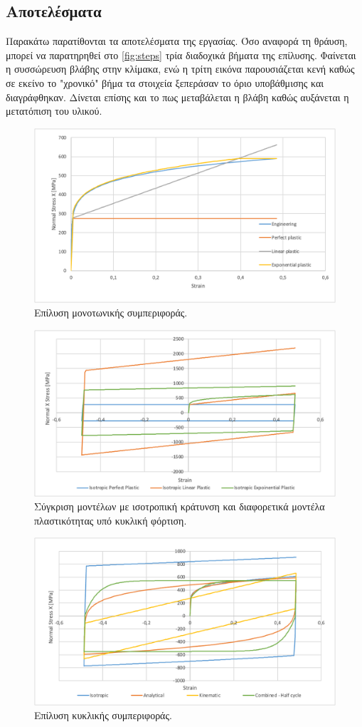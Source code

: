 \documentclass{article}
\begin{document}
\subsection{Αποτελέσματα}
Παρακάτω παρατίθονται τα αποτελέσματα της εργασίας. Όσο αναφορά τη θράυση, μπορεί να παρατηρηθεί στο \ref{fig:steps} τρία διαδοχικά βήματα της επίλυσης. Φαίνεται η συσσώρευση βλάβης στην κλίμακα, ενώ η τρίτη εικόνα παρουσιάζεται κενή καθώς σε εκείνο το "χρονικό" βήμα τα στοιχεία ξεπεράσαν το όριο υποβάθμισης και διαγράφθηκαν. Δίνεται επίσης και το πως μεταβάλεται η βλάβη καθώς αυξάνεται η μετατόπιση του υλικού.
\begin{figure}[H]
    \centering
    \includegraphics[width=0.7\linewidth]{media/static.png}
    \caption{Επίλυση μονοτωνικής συμπεριφοράς.}
    \label{fig:static}
\end{figure}

\begin{figure}[H]
    \centering
    \includegraphics[width=0.7\linewidth]{media/dynamic-iso.png}
    \caption{Σύγκριση μοντέλων με ισοτροπική κράτυνση και διαφορετικά μοντέλα πλαστικότητας υπό κυκλική φόρτιση.}
    \label{fig:dyniso}
\end{figure}

\begin{figure}[H]
    \centering
    \includegraphics[width=0.7\linewidth]{media/dynamic.png}
    \caption{Επίλυση κυκλικής συμπεριφοράς.}
    \label{fig:dyn}
\end{figure}
\end{document}
